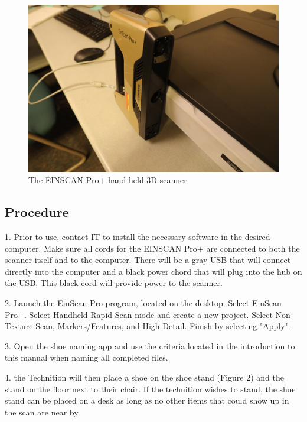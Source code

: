 \begin{figure}[!htp]
\centering
\includegraphics[scale=0.5]{3D_Scanner}
\caption{The EINSCAN Pro+ hand held 3D scanner}
\label{Image 1}
\end{figure}

\subsection{Procedure}

1.	Prior to use, contact IT to install the necessary software in the desired computer. Make sure all cords for the EINSCAN Pro+ are connected to both the scanner itself and to the computer. There will be a gray USB that will connect directly into the computer and a black power chord that will plug into the hub on the USB. This black cord will provide power to the scanner.

2. Launch the EinScan Pro program, located on the desktop. Select EinScan Pro+. Select Handheld Rapid Scan mode and create a new project. Select Non-Texture Scan, Markers/Features, and High Detail. Finish by selecting "Apply".

3. Open the shoe naming app and use the criteria located in the introduction to this manual when naming all completed files.

4. the Technition will then place a shoe on the shoe stand (Figure 2) and the stand on the floor next to their chair. If the technition wishes to stand, the shoe stand can be placed on a desk as long as no other items that could show up in the scan are near by.


